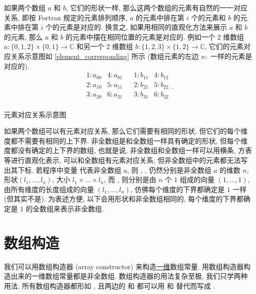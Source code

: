 如果两个数组 $a$ 和 $b$, 它们的形状一样, 那么这两个数组的元素有自然的一一对应关系, 即按 Fortran 规定的元素排列顺序, $a$ 的元素中排在第 $i$ 个的元素和 $b$ 的元素中排在第 $i$ 个的元素是对应的. 换言之, 如果用相同的直观化方法来展示 $a$ 和 $b$ 的元素, 那么 $a$ 和 $b$ 的元素中摆在相同位置的元素是对应的. 例如一个 $2$ 维数组 $a\colon \{0,1,2\}\times\{0,1\}\to\mathbb{C}$ 和另一个 $2$ 维数组 $b\colon \{1,2,3\}\times\{1,2\}\to\mathbb{C}$, 它们的元素对应关系示意图如 \ref{element_corresponding} 所示 (数组元素的左边 $n \colon$ 一样的元素是对应的).
\begin{equation}
    \begin{matrix}
        1 \colon a_{00}&4 \colon a_{01}&
        &1 \colon b_{11}&4 \colon b_{12}\\
        2 \colon a_{10}&5 \colon a_{11}&
        &2 \colon b_{21}&5 \colon b_{22}\\
        3 \colon a_{20}&6 \colon a_{21}&
        &3 \colon b_{31}&6 \colon b_{32}\\
    \end{matrix}.\label{element_corresponding}
\end{equation}
\begin{center}
    元素对应关系示意图
\end{center}

如果两个数组可以有元素对应关系, 那么它们需要有相同的形状, 但它们的每个维度都不需要有相同的上下界. 非全数组是和全数组一样具有确定的形状, 但每个维度都没有确定的上下界的数组, 也就是说, 非全数组和全数组一样可以用横条, 方表等进行直观化表示, 可以和全数组有元素对应关系, 但非全数组中的元素都无法写出其下标. 若程序中变量  代表非全数组 $a$, 则 , ,  仍然分别是非全数组 $a$ 的维数 $n$, 形状$(l_1, \dots, l_n)$, 大小 $l_1\times\dots\times l_n$, 而 ,  则分别是由 $n$ 个 $1$ 组成的向量 $(1, \dots, 1)$, 由所有维度的长度组成的向量 $(l_1, \dots, l_n)$, 仿佛每个维度的下界都确定是 $1$ 一样 (但其实不是). 为表述方便, 以下会用形状和非全数组相同的, 每个维度的下界都确定是 $1$ 的全数组来表示非全数组.

\section{数组构造}\label{fortran_array_construction}

我们可以用数组构造器 (array constructor) 来构造\uline{一维}数组常量. 用数组构造器构造出来的一维数组常量都是非全数组. 数组构造器的用法复杂至极, 我们只学两种用法. 所有数组构造器都形如 \ttt{[...]}, 且两边的 \ttt{[} 和 \ttt{]} 都可以用 \ttt{(/} 和 \ttt{/)} 替代而写成 .

